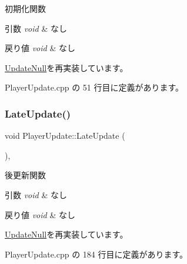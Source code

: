 初期化関数 


\begin{DoxyParams}{引数}
{\em void} & なし \\
\hline
\end{DoxyParams}

\begin{DoxyRetVals}{戻り値}
{\em void} & なし \\
\hline
\end{DoxyRetVals}


\mbox{\hyperlink{class_update_null_aaa8f5fe1f03e252ad75eb8c888a5bf46}{Update\+Null}}を再実装しています。



 Player\+Update.\+cpp の 51 行目に定義があります。

\mbox{\label{class_player_update_ae376f517f3458edfef61ac366aa78e36}} 
\subsubsection{\texorpdfstring{Late\+Update()}{LateUpdate()}}
{\footnotesize\ttfamily void Player\+Update\+::\+Late\+Update (\begin{DoxyParamCaption}{ }\end{DoxyParamCaption})\hspace{0.3cm}{\ttfamily [override]}, {\ttfamily [virtual]}}



後更新関数 


\begin{DoxyParams}{引数}
{\em void} & なし \\
\hline
\end{DoxyParams}

\begin{DoxyRetVals}{戻り値}
{\em void} & なし \\
\hline
\end{DoxyRetVals}


\mbox{\hyperlink{class_update_null_a8d335882bce4eab384d44c4bae474ee5}{Update\+Null}}を再実装しています。



 Player\+Update.\+cpp の 184 行目に定義があります。

\mbox{\label{class_player_update_a997e0813a825d7525da4b5b89a290168}} 

